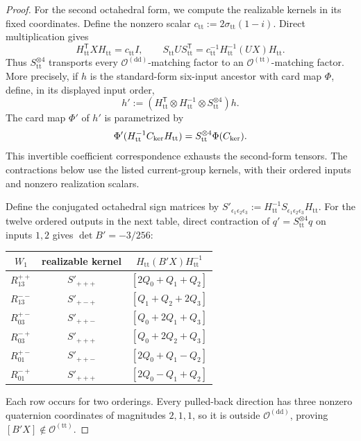 \documentclass[11pt,letterpaper,onecolumn]{article}
\theoremstyle{plain}
\theoremstyle{definition}
\theoremstyle{remark}
\newcommand{\OctDD}{{\mathcal O^{(\mathrm{dd})}}}
\newcommand{\OctTT}{{\mathcal O^{(\mathrm{tt})}}}
\begin{document}
\begin{proof}
\begin{sloppypar}
For the second octahedral form, we compute the realizable kernels in its
fixed coordinates.  Define the nonzero scalar
\(c_{\mathrm{tt}}:=2\sigma_{\mathrm{tt}}(1-i)\).  Direct multiplication gives
\begin{equation}
 H_{\mathrm{tt}}^{\mathsf T}XH_{\mathrm{tt}}=c_{\mathrm{tt}}I,
 \qquad
 S_{\mathrm{tt}}US_{\mathrm{tt}}^{\mathsf T}
 =c_{\mathrm{tt}}^{-1}H_{\mathrm{tt}}^{-1}(UX)H_{\mathrm{tt}}.
 \label{eq:cert-Oprime-transport}
\end{equation}
Thus \(S_{\mathrm{tt}}^{\otimes4}\) transports every
\(\OctDD\)-matching factor to
an \(\OctTT\)-matching factor.  More precisely, if \(h\) is the
standard-form six-input ancestor with card map \(\Phi\), define, in its
displayed input order,
\[
 h':=(H_{\mathrm{tt}}^{\mathsf T}\otimes H_{\mathrm{tt}}^{-1}
       \otimes S_{\mathrm{tt}}^{\otimes4})h.
\]
The card map \(\Phi'\) of \(h'\) is parametrized by
\hypertarget{eq:cert-Oprime-card-map}{}
\begin{equation*}
 \Phi'(H_{\mathrm{tt}}^{-1}C_{\rm ker}H_{\mathrm{tt}})
 =S_{\mathrm{tt}}^{\otimes4}\Phi(C_{\rm ker}).
\end{equation*}
This invertible coefficient correspondence exhausts the second-form
tensors.  The contractions below use the listed current-group
kernels, with their ordered inputs and nonzero realization scalars.
\end{sloppypar}
Define the conjugated octahedral sign matrices by
\(S'_{\epsilon_1\epsilon_2\epsilon_3}
:=H_{\mathrm{tt}}^{-1}S_{\epsilon_1\epsilon_2\epsilon_3}H_{\mathrm{tt}}\).
For the twelve ordered
outputs in the next table, direct contraction of
\(q'=S_{\mathrm{tt}}^{\otimes4}q\) on inputs \(1,2\) gives
\(\det B'=-3/256\):
\begin{center}
\normalsize
\setlength{\tabcolsep}{5pt}
\begin{tabular}{ccc}
\toprule
\(W_1\)&realizable kernel&
\(H_{\mathrm{tt}}(B'X)H_{\mathrm{tt}}^{-1}\)\\
\midrule
\(R_{13}^{++}\)&\(S'_{+++}\)&\([2Q_0+Q_1+Q_2]\)\\
\(R_{13}^{--}\)&\(S'_{+-+}\)&\([Q_1+Q_2+2Q_3]\)\\
\(R_{03}^{+-}\)&\(S'_{++-}\)&\([Q_0+2Q_1+Q_3]\)\\
\(R_{03}^{-+}\)&\(S'_{+++}\)&\([Q_0+2Q_2+Q_3]\)\\
\(R_{01}^{+-}\)&\(S'_{++-}\)&\([2Q_0+Q_1-Q_2]\)\\
\(R_{01}^{-+}\)&\(S'_{+++}\)&\([2Q_0-Q_1+Q_2]\)\\
\bottomrule
\end{tabular}
\end{center}
Each row occurs for two orderings.  Every pulled-back direction has three
nonzero quaternion coordinates of magnitudes \(2,1,1\), so it is outside
\(\OctDD\), proving \([B'X]\notin\OctTT\).


\end{proof}
\end{document}
